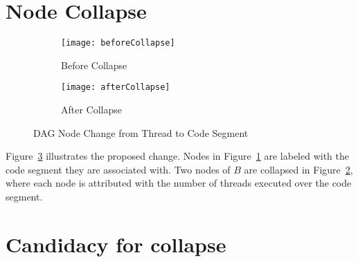 \section{Node Collapse}


\begin{figure}
  \centering
  \begin{subfigure}[b]{0.4\textwidth}{
      \texttt{[image: beforeCollapse]}
      \caption{Before Collapse}
      \label{fig:before-collapse}
    }
  \end{subfigure} \quad
  \begin{subfigure}[b]{0.4\textwidth}{
      \texttt{[image: afterCollapse]}
      \caption{After Collapse}
      \label{fig:after-collapse}
    }
  \end{subfigure}
  \caption{DAG Node Change from Thread to Code Segment}
  \label{fig:dag-collapse}
\end{figure}



Figure~\ref{fig:dag-collapse} illustrates the proposed change. Nodes in
Figure~\ref{fig:before-collapse} are labeled with the code segment
they are associated with. Two nodes of ${B}$ are collapsed in
Figure~\ref{fig:after-collapse}, where each node is attributed with
the number of threads executed over the code segment.


\section{Candidacy for collapse}

